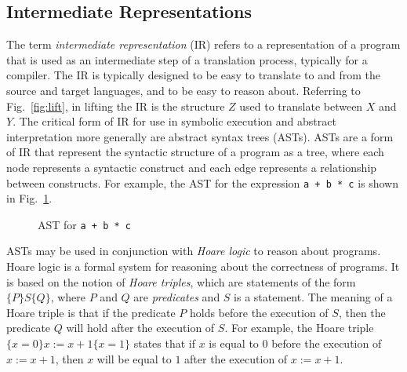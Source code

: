 \subsection{Intermediate Representations}

The term \emph{intermediate representation} (IR) refers to a representation of a program that is used as an intermediate step of a translation process, typically for a compiler.
The IR is typically designed to be easy to translate to and from the source and target languages, and to be easy to reason about.
Referring to Fig.~\ref{fig:lift}, in lifting the IR is the structure $Z$ used to translate between $X$ and $Y$.
The critical form of IR for use in symbolic execution and abstract interpretation more generally are abstract syntax trees (ASTs).
ASTs are a form of IR that represent the syntactic structure of a program as a tree, where each node represents a syntactic construct and each edge represents a relationship between constructs.
For example, the AST for the expression \texttt{a + b * c} is shown in Fig.~\ref{fig:ast}.

\begin{figure}[h]
\centering
{}
\caption{AST for \texttt{a + b * c}}
\label{fig:ast}
\end{figure}

ASTs may be used in conjunction with \emph{Hoare logic} to reason about programs.
Hoare logic is a formal system for reasoning about the correctness of programs.
It is based on the notion of \emph{Hoare triples}, which are statements of the form $\{P\} S \{Q\}$, where $P$ and $Q$ are \emph{predicates} and $S$ is a statement.
The meaning of a Hoare triple is that if the predicate $P$ holds before the execution of $S$, then the predicate $Q$ will hold after the execution of $S$.
For example, the Hoare triple $\{x = 0\} x := x + 1 \{x = 1\}$ states that if $x$ is equal to $0$ before the execution of $x := x + 1$, then $x$ will be equal to $1$ after the execution of $x := x + 1$.

